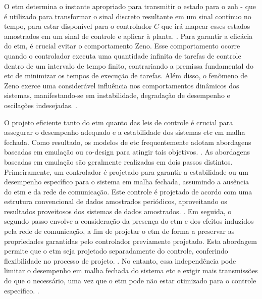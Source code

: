 O \acrshort{etm} determina o instante apropriado para transmitir o estado para o \acrfull{zoh} - que é utilizado para transformar o sinal discreto resultante em um sinal contínuo no tempo,  para estar disponível para o controlador $C$ que irá mapear esses estados amostrados em um sinal de controle e aplicar à planta. \cite{coutinho2021}. Para garantir a eficácia do \acrshort{etm}, é crucial evitar o comportamento Zeno. Esse comportamento ocorre quando o controlador executa uma quantidade infinita de tarefas de controle dentro de um intervalo de tempo finito, contrariando a premissa fundamental do \acrshort{etc} de minimizar os tempos de execução de tarefas. Além disso, o fenômeno de Zeno exerce uma considerável influência nos comportamentos dinâmicos dos sistemas, manifestando-se em instabilidade, degradação de desempenho e oscilações indesejadas. \cite{Yang2024}.

O projeto eficiente tanto do \acrshort{etm} quanto das leis de controle é crucial para assegurar o desempenho adequado e a estabilidade dos sistemas \acrshort{etc} em malha fechada. Como resultado, os modelos de \acrshort{etc} frequentemente adotam abordagens baseadas em emulação ou co-design para atingir tais objetivos. \cite{coutinho2021, peng2018}. As abordagens baseadas em emulação são geralmente realizadas em dois passos distintos. Primeiramente, um controlador é projetado para garantir a estabilidade ou um desempenho específico para o sistema em malha fechada, assumindo a ausência do \acrshort{etm} e da rede de comunicação. Este controle é projetado de acordo com uma estrutura convencional de dados amostrados periódicos, aproveitando os resultados proveitosos dos sistemas de dados amostrados. \cite{coutinho2021,peng2018}. Em seguida, o segundo passo envolve a consideração da presença do \acrshort{etm} e dos efeitos induzidos pela rede de comunicação, a fim de projetar o \acrshort{etm} de forma a preservar as propriedades garantidas pelo controlador previamente projetado. Esta abordagem permite que o \acrshort{etm} seja projetado separadamente do controle, conferindo flexibilidade no processo de projeto. \cite{coutinho2021,peng2018}. No entanto, essa independência pode limitar o desempenho em malha fechada do sistema \acrshort{etc} e exigir mais transmissões do que o necessário, uma vez que o \acrshort{etm} pode não estar otimizado para o controle específico. \cite{coutinho2021}.

